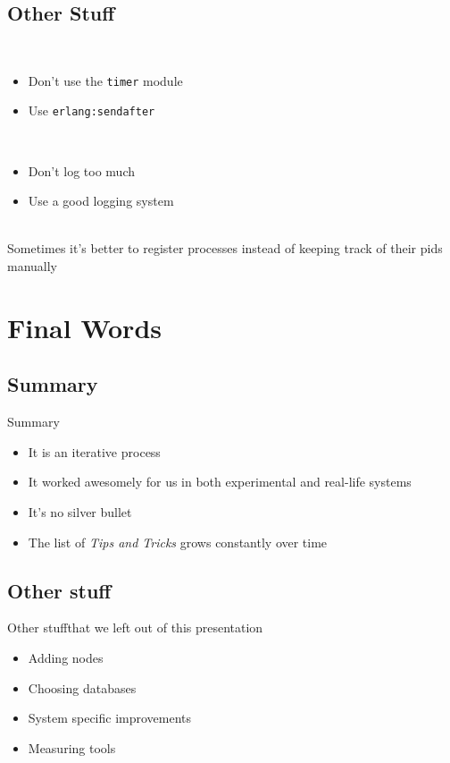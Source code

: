 \documentclass[utf8]{beamer}
\begin{document}
\subsection{Other Stuff}
\begin{frame}
	\begin{description}
		\item<+->[Timers]\ \\
			\begin{itemize}
				\item Don't use the \texttt{timer} module
				\item Use \texttt{erlang:send\textunderscore after}
			\end{itemize}
		\item<+->[Logging]\ \\
			\begin{itemize}
				\item Don't log too much
				\item Use a good logging system
			\end{itemize}
		\item<+->[Registration]\ \\
			Sometimes it's better to register processes instead of keeping track of their pids manually
	\end{description}
\end{frame}

\section{Final Words}
\subsection{Summary}
\begin{frame}{Summary}
	\begin{itemize}
		\item<+-> It is an \alert{iterative} process
		\item<+-> It worked awesomely for us in both experimental and real-life systems
		\item<+-> It's no \alert{silver bullet}
		\item<+-> The list of \emph{Tips and Tricks} grows \alert{constantly} over time
	\end{itemize}
\end{frame}
\subsection{Other stuff}
\begin{frame}{Other stuff}{that we left out of this presentation}
	\begin{itemize}
		\item Adding nodes
		\item Choosing databases
		\item System specific improvements
		\item Measuring tools
	\end{itemize}
\end{frame}
\end{document}
